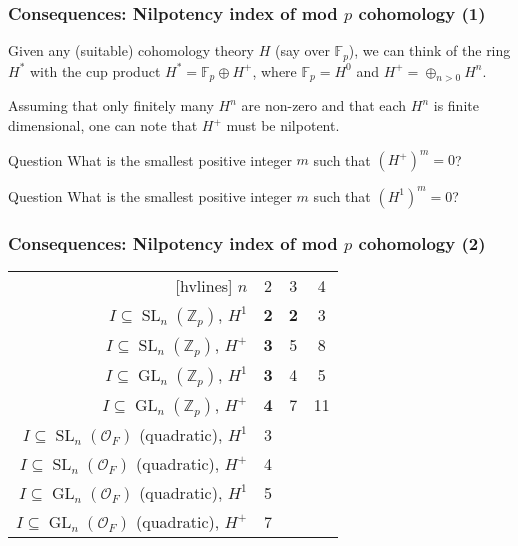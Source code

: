 \documentclass{beamer}
\newcommand*\Z{\mathbb{Z}}
\newcommand*\F{\mathbb{F}}
\DeclareMathOperator{\GL}{GL} %
\DeclareMathOperator{\SL}{SL} %
\newcommand*\sO{\mathcal{O}}
\begin{document}
\begin{frame}
  \frametitle{Consequences: Nilpotency index of mod $p$ cohomology (1)}

  Given any (suitable) cohomology theory $H$ (say over $\F_{p}$), we can think of the ring $H^{*}$ with the cup product $H^{*} = \F_{p} \oplus H^{+}$, where $\F_{p} = H^{0}$ and $H^{+} = \oplus_{n>0} H^{n}$.

  Assuming that only finitely many $H^{n}$ are non-zero and that each $H^{n}$ is finite dimensional, one can note that $H^{+}$ must be nilpotent.

  \begin{block}{Question}
    What is the smallest positive integer $m$ such that $(H^{+})^{m} = 0$?
  \end{block}

  \begin{block}{Question}
    What is the smallest positive integer $m$ such that $(H^{1})^{m} = 0$?
  \end{block}
\end{frame}

\begin{frame}
  \frametitle{Consequences: Nilpotency index of mod $p$ cohomology (2)}

  \begin{center}
    \begin{NiceTabular}{rccc}[hvlines]
      $n$ & 2 & 3 & 4 \\
      $I \subseteq \SL_{n}(\Z_{p})$, $H^{1}$ & \textbf{2} & \textbf{2} & 3 \\
      $I \subseteq \SL_{n}(\Z_{p})$, $H^{+}$ & \textbf{3} & 5 & 8  \\
      $I \subseteq \GL_{n}(\Z_{p})$, $H^{1}$ & \textbf{3} & 4 & 5 \\
      $I \subseteq \GL_{n}(\Z_{p})$, $H^{+}$ & \textbf{4} & 7 & 11 \\
      $I \subseteq \SL_{n}(\sO_{F})$ (quadratic), $H^{1}$ & 3 \\
      $I \subseteq \SL_{n}(\sO_{F})$ (quadratic), $H^{+}$ & 4 \\
      $I \subseteq \GL_{n}(\sO_{F})$ (quadratic), $H^{1}$ & 5 \\
      $I \subseteq \GL_{n}(\sO_{F})$ (quadratic), $H^{+}$ & 7
    \end{NiceTabular}
  \end{center}
\end{frame}

\end{document}
